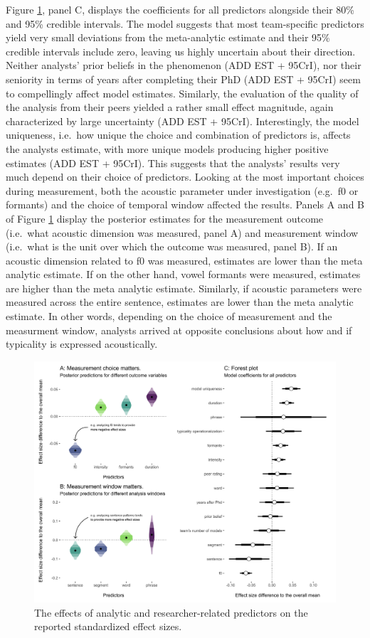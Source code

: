 \documentclass[Review,times,sageh]{sagej}
\begin{document}
Figure \ref{fig:plot-meta2}, panel C, displays the coefficients for all predictors alongside their 80\% and 95\% credible intervals.
The model suggests that most team-specific predictors yield very small deviations from the meta-analytic estimate and their 95\% credible intervals include zero, leaving us highly uncertain about their direction.
Neither analysts' prior beliefs in the phenomenon (ADD EST + 95CrI), nor their seniority in terms of years after completing their PhD (ADD EST + 95CrI) seem to compellingly affect model estimates.
Similarly, the evaluation of the quality of the analysis from their peers yielded a rather small effect magnitude, again characterized by large uncertainty (ADD EST + 95CrI).
Interestingly, the model uniqueness, i.e.~how unique the choice and combination of predictors is, affects the analysts estimate, with more unique models producing higher positive estimates (ADD EST + 95CrI).
This suggests that the analysts' results very much depend on their choice of predictors.
Looking at the most important choices during measurement, both the acoustic parameter under investigation (e.g.~f0 or formants) and the choice of temporal window affected the results.
Panels A and B of Figure \ref{fig:plot-meta2} display the posterior estimates for the measurement outcome (i.e.~what acoustic dimension was measured, panel A) and measurement window (i.e.~what is the unit over which the outcome was measured, panel B).
If an acoustic dimension related to f0 was measured, estimates are lower than the meta analytic estimate.
If on the other hand, vowel formants were measured, estimates are higher than the meta analytic estimate.
Similarly, if acoustic parameters were measured across the entire sentence, estimates are lower than the meta analytic estimate.
In other words, depending on the choice of measurement and the measurment window, analysts arrived at opposite conclusions about how and if typicality is expressed acoustically.

\begin{figure}
\includegraphics[width=1\linewidth]{../figs/alltogether} \caption{The effects of analytic and researcher-related predictors on the reported standardized effect sizes.}\label{fig:plot-meta2}
\end{figure}
\end{document}
